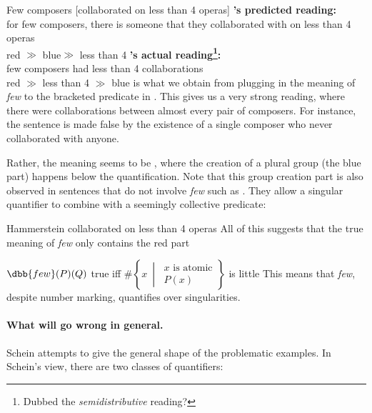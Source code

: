 \pex
\a Few composers [collaborated on less than 4 operas]
\a 
\textbf{'s predicted reading:}\\
 for few composers, there is someone that they collaborated with on less than 4 operas\\
{\color{darkred}red} $\gg$ {\color{darkblue}blue}$\gg$ less than 4
\a \textbf{'s actual reading\footnote{Dubbed the \emph{semidistributive} reading?}:}\\
 few composers had less than 4 collaborations\\ 
{\color{darkred}red} $\gg$ less than 4 $\gg$ {\color{darkblue}blue}
\xe
%
 is what we obtain from plugging in the meaning of  \emph{few} to the bracketed predicate in . This gives us a very strong reading, where there were collaborations between almost every pair of composers. For instance, the sentence is made false by the existence of a single composer who never collaborated with anyone. 

Rather, the meaning seems to be , where the creation of a plural group (the blue part) happens below the  quantification. Note that this group creation part is also observed in sentences that do not involve \emph{few} such as \cnextx. They allow a singular quantifier to combine with a seemingly collective predicate:

\ex
Hammerstein collaborated on less than 4 operas
\xe
%
All of this suggests that the true meaning of \emph{few} only contains the red part

\ex
$\dbb{few}(P)(Q)$ true iff {\color{darkred}$\#\left\lbrace x\ \middle|\ 
\begin{array}{l}
x\text{ is atomic}\\
P(x)
\end{array}
\right\rbrace$ is little \label{few2}
}\xe
%
This means that \emph{few}, despite number marking, quantifies over singularities.

\paragraph{What will go wrong in general.} 
Schein attempts to give the general shape of the problematic examples.
In Schein's view, there are two classes of quantifiers:


